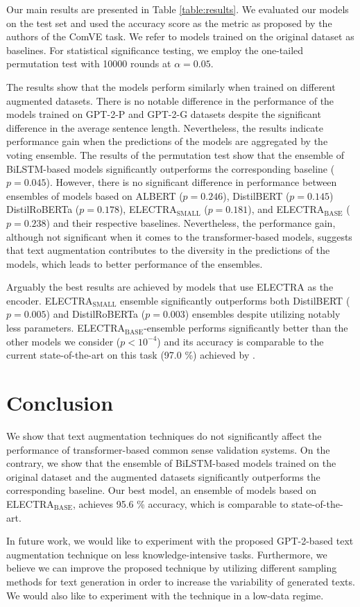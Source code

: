 \documentclass[10pt, a4paper]{article}
\begin{document}
Our main results are presented in Table \ref{table:results}. We evaluated our models on the test set and used the accuracy score as the metric as proposed by the authors of the ComVE task. We refer to models trained on the original dataset as baselines. For statistical significance testing, we employ the one-tailed permutation test with 10000 rounds at $\alpha = 0.05$.

The results show that the models perform similarly when trained on different augmented datasets. There is no notable difference in the performance of the models trained on GPT-2-P and GPT-2-G datasets despite the significant difference in the average sentence length. Nevertheless, the results indicate performance gain when the predictions of the models are aggregated by the voting ensemble. The results of the permutation test show that the ensemble of BiLSTM-based models significantly outperforms the corresponding baseline ($p=0.045$). However, there is no significant difference in performance between ensembles of models based on ALBERT ($p=0.246$), DistilBERT ($p=0.145$) DistilRoBERTa ($p=0.178$), ELECTRA$_\text{SMALL}$ ($p=0.181$), and ELECTRA$_\text{BASE}$ ($p=0.238$) and their respective baselines. Nevertheless, the performance gain, although not significant when it comes to the transformer-based models, suggests that text augmentation contributes to the diversity in the predictions of the models, which leads to better performance of the ensembles. 

Arguably the best results are achieved by models that use ELECTRA as the encoder. ELECTRA$_\text{SMALL}$ ensemble significantly outperforms both DistilBERT ($p = 0.005$) and DistilRoBERTa ($p = 0.003$) ensembles despite utilizing notably less parameters. ELECTRA$_\text{BASE}$-ensemble performs significantly better than the other models we consider ($p < 10^{-4}$) and its accuracy is comparable to the current state-of-the-art on this task (97.0 \%) achieved by \citet{zhang-etal-2020-cn}. 


\section{Conclusion}
 We show that text augmentation techniques do not significantly affect the performance of transformer-based common sense validation systems. On the contrary, we show that the ensemble of BiLSTM-based models trained on the original dataset and the augmented datasets significantly outperforms the corresponding baseline. Our best model, an ensemble of models based on ELECTRA$_\text{BASE}$, achieves 95.6 \% accuracy, which is comparable to state-of-the-art.

In future work, we would like to experiment with the proposed GPT-2-based text augmentation technique on less knowledge-intensive tasks. Furthermore, we believe we can improve the proposed technique by utilizing different sampling methods for text generation in order to increase the variability of generated texts. We would also like to experiment with the technique in a low-data regime.

\newpage\newpage


 
\end{document}
